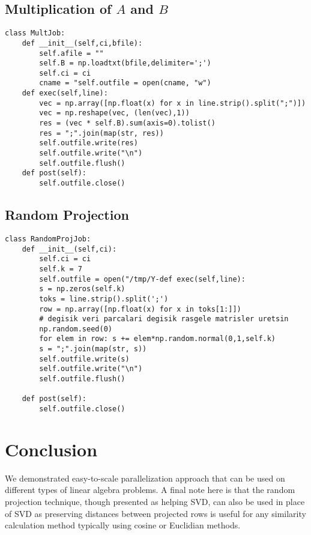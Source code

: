 \documentclass{article}
\begin{document}
\subsection{Multiplication of $A$ and $B$}

\begin{verbatim}
class MultJob:
    def __init__(self,ci,bfile):
        self.afile = ""
        self.B = np.loadtxt(bfile,delimiter=';')
        self.ci = ci
        cname = "self.outfile = open(cname, "w")        
    def exec(self,line):        
        vec = np.array([np.float(x) for x in line.strip().split(";")])
        vec = np.reshape(vec, (len(vec),1))
        res = (vec * self.B).sum(axis=0).tolist()  
        res = ";".join(map(str, res))
        self.outfile.write(res)
        self.outfile.write("\n")
        self.outfile.flush()
    def post(self):
        self.outfile.close()
\end{verbatim}

\subsection{Random Projection}

\begin{verbatim}
class RandomProjJob:
    def __init__(self,ci):
        self.ci = ci
        self.k = 7
        self.outfile = open("/tmp/Y-def exec(self,line):
        s = np.zeros(self.k)
        toks = line.strip().split(';')
        row = np.array([np.float(x) for x in toks[1:]])
        # degisik veri parcalari degisik rasgele matrisler uretsin
        np.random.seed(0) 
        for elem in row: s += elem*np.random.normal(0,1,self.k) 
        s = ";".join(map(str, s))
        self.outfile.write(s)
        self.outfile.write("\n")
        self.outfile.flush()
        
    def post(self):
        self.outfile.close()
\end{verbatim}

\section{Conclusion}

We demonstrated easy-to-scale parallelization approach that can be used on
different types of linear algebra problems. A final note here is that the random
projection technique, though presented as helping SVD, can also be used in place
of SVD \cite{lu} as preserving distances between projected rows is useful for
any similarity calculation method typically using cosine or Euclidian methods.
\end{document}
